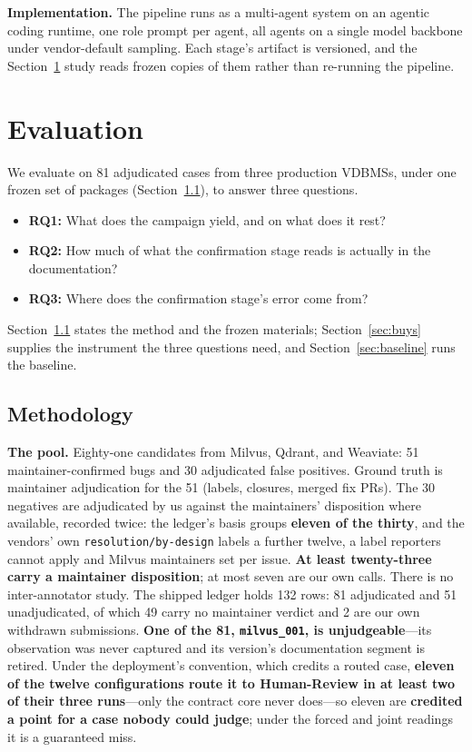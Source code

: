 \documentclass[acmsmall,screen,review,anonymous]{acmart}
\begin{document}
\textbf{Implementation.} The pipeline runs as a multi-agent system on an agentic coding runtime, one
role prompt per agent, all agents on a single model backbone under vendor-default sampling. Each
stage's artifact is versioned, and the Section~\ref{sec:eval} study reads frozen copies of them
rather than re-running the pipeline.

\section{Evaluation}
\label{sec:eval}

We evaluate on 81 adjudicated cases from three production VDBMSs, under one frozen set of packages
(Section~\ref{sec:method}), to answer three questions.

\begin{itemize}
  \item \textbf{RQ1:} What does the campaign yield, and on what does it rest?
  \item \textbf{RQ2:} How much of what the confirmation stage reads is actually in the documentation?
  \item \textbf{RQ3:} Where does the confirmation stage's error come from?
\end{itemize}

Section~\ref{sec:method} states the method and the frozen materials; Section~\ref{sec:buys} supplies
the instrument the three questions need, and Section~\ref{sec:baseline} runs the baseline.

\subsection{Methodology}
\label{sec:method}

\textbf{The pool.} Eighty-one candidates from Milvus, Qdrant, and Weaviate: 51 maintainer-confirmed
bugs and 30 adjudicated false positives. Ground truth is maintainer adjudication for the 51 (labels,
closures, merged fix PRs). The 30 negatives are adjudicated by us against the maintainers' disposition
where available, recorded twice: the ledger's basis groups \textbf{eleven of the thirty}, and the
vendors' own \texttt{resolution/by-design} labels a further twelve, a label reporters cannot apply and
Milvus maintainers set per issue. \textbf{At least twenty-three carry a maintainer disposition}; at
most seven are our own calls. There is no inter-annotator study. The shipped ledger holds 132
rows: 81 adjudicated and 51 unadjudicated, of which 49 carry no maintainer verdict and 2 are our own
withdrawn submissions. \textbf{One of the 81, \texttt{milvus\_001}, is
unjudgeable}---its observation was never captured and its version's documentation segment is
retired. Under the deployment's convention, which credits a routed case, \textbf{eleven of the
twelve configurations route it to Human-Review in at least two of their three runs}---only the
contract core never does---so eleven are \textbf{credited a point for a case nobody could judge};
under the forced and joint readings it is a guaranteed miss.
\end{document}

